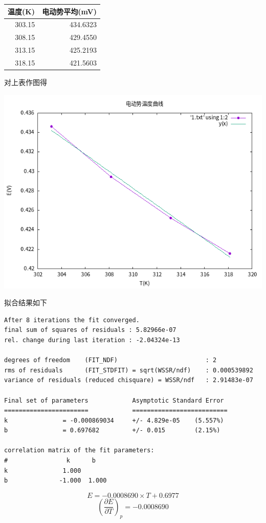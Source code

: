 \documentclass[11pt]{report}
\begin{document}
\begin{center}
\begin{tabular}{rr}
温度(K) & 电动势平均(mV)\\
\hline
303.15 & 434.6323\\
308.15 & 429.4550\\
313.15 & 425.2193\\
318.15 & 421.5603\\
\end{tabular}
\end{center}
对上表作图得
\begin{center}
\includegraphics[width=.9\linewidth]{../data/E-T.png}
\end{center}
拟合结果如下
\begin{verbatim}
After 8 iterations the fit converged.
final sum of squares of residuals : 5.82966e-07
rel. change during last iteration : -2.04324e-13

degrees of freedom    (FIT_NDF)                        : 2
rms of residuals      (FIT_STDFIT) = sqrt(WSSR/ndf)    : 0.000539892
variance of residuals (reduced chisquare) = WSSR/ndf   : 2.91483e-07

Final set of parameters            Asymptotic Standard Error
=======================            ==========================
k               = -0.000869034     +/- 4.829e-05    (5.557%)
b               = 0.697682         +/- 0.015        (2.15%)

correlation matrix of the fit parameters:
#                k      b      
k               1.000 
b              -1.000  1.000 

\end{verbatim}
\[
E=-0.0008690\times T+0.6977
\]
\[
\left(\frac{\partial E}{\partial T}\right)_{p}=-0.0008690
\]
\end{document}
